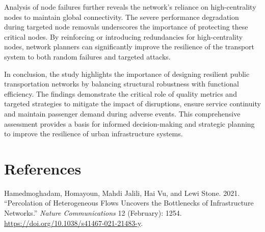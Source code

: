 \documentclass[
  letterpaper,
  DIV=11,
  numbers=noendperiod]{scrartcl}
\newlength{\cslhangindent}
\newenvironment{CSLReferences}[2] %
 {\begin{list}{}{%
  \setlength{\itemindent}{0pt}
  \setlength{\leftmargin}{0pt}
  \setlength{\parsep}{0pt}
  \ifodd #1
   \setlength{\leftmargin}{\cslhangindent}
   \setlength{\itemindent}{-1\cslhangindent}
  \fi
  \setlength{\itemsep}{#2\baselineskip}}}
 {\end{list}}
\begin{document}
Analysis of node failures further reveals the network's reliance on
high-centrality nodes to maintain global connectivity. The severe
performance degradation during targeted node removals underscores the
importance of protecting these critical nodes. By reinforcing or
introducing redundancies for high-centrality nodes, network planners can
significantly improve the resilience of the transport system to both
random failures and targeted attacks.

In conclusion, the study highlights the importance of designing
resilient public transportation networks by balancing structural
robustness with functional efficiency. The findings demonstrate the
critical role of quality metrics and targeted strategies to mitigate the
impact of disruptions, ensure service continuity and maintain passenger
demand during adverse events. This comprehensive assessment provides a
basis for informed decision-making and strategic planning to improve the
resilience of urban infrastructure systems.

\section{References}\label{references}

\label{refs}
\begin{CSLReferences}{1}{0}
Hamedmoghadam, Homayoun, Mahdi Jalili, Hai Vu, and Lewi Stone. 2021.
{``Percolation of Heterogeneous Flows Uncovers the Bottlenecks of
Infrastructure Networks.''} \emph{Nature Communications} 12 (February):
1254. \url{https://doi.org/10.1038/s41467-021-21483-y}.

\end{CSLReferences}
\end{document}
